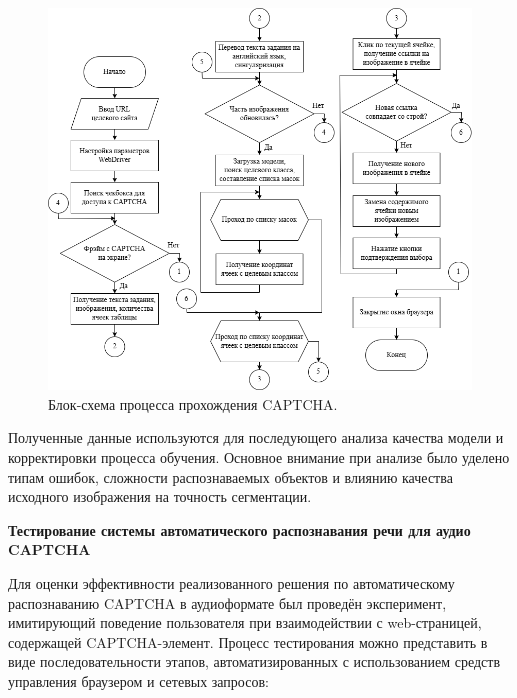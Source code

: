 \begin{figure}[H]
    \centering
    \includegraphics[width=1\textwidth]{imgs/imagecaptcha/solve_captcha_flow.png}
    \caption{Блок-схема процесса прохождения CAPTCHA.}
    \label{fig:solve-captcha}
\end{figure}
\vspace{-0.5cm}

Полученные данные используются для последующего анализа качества модели и 
корректировки процесса обучения. Основное внимание при анализе было уделено 
типам ошибок, сложности распознаваемых объектов и влиянию качества исходного 
изображения на точность сегментации.

\textbf{Тестирование системы автоматического распознавания речи для аудио CAPTCHA}

Для оценки эффективности реализованного решения по автоматическому распознаванию 
CAPTCHA в аудиоформате был проведён эксперимент, имитирующий поведение 
пользователя при взаимодействии с web-страницей, содержащей CAPTCHA-элемент. 
Процесс тестирования можно представить в виде последовательности этапов, 
автоматизированных с использованием средств управления браузером и сетевых 
запросов:

